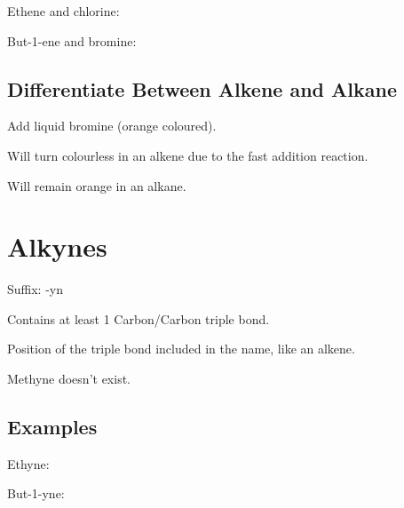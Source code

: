 \documentclass[a4paper,11pt]{article}
\begin{document}
Ethene and chlorine:

\begin{center}
\end{center}

But-1-ene and bromine:

\begin{center}
\end{center}


\subsection{Differentiate Between Alkene and Alkane}

Add liquid bromine (orange coloured).

Will turn colourless in an alkene due to the fast addition reaction.

Will remain orange in an alkane.




\section{Alkynes}

Suffix: -yn

Contains at least 1 Carbon/Carbon triple bond.

Position of the triple bond included in the name, like an alkene.

Methyne doesn't exist.


\subsection{Examples}

Ethyne:

\begin{center}
\end{center}

But-1-yne:

\begin{center}
\end{center}
\end{document}
